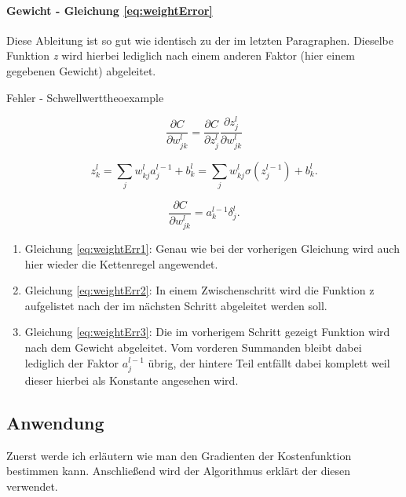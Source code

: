 \paragraph{Gewicht - Gleichung \ref{eq:weightError}}
Diese Ableitung ist so gut wie identisch zu der im letzten Paragraphen. Dieselbe Funktion \emph{z} wird hierbei lediglich nach einem anderen Faktor (hier einem gegebenen Gewicht) abgeleitet. 

\begin{myderivation}{Fehler - Schwellwert}{theoexample} 


\begin{equation} \label{eq:weightErr1}
\frac{\partial C}{\partial w^l_{jk}} = \frac{\partial C}{\partial z^l_j} \frac{\partial z^l_j}{\partial w^l_{jk}}
\end{equation}

\begin{equation} \label{eq:weightErr2}
z^{l}_k = \sum_j w^{l}_{kj} a^{l-1}_j +b^l_k = \sum_j w^l_{kj} \sigma(z^{l-1}_j) +b^l_k.
\end{equation}

\begin{equation} \label{eq:weightErr3}
\frac{\partial C}{\partial w^l_{jk}} = a^{l-1}_k \delta^l_j.
\end{equation}

\end{myderivation} 


\begin{enumerate}

\item Gleichung \ref{eq:weightErr1}: Genau wie bei der vorherigen Gleichung wird auch hier wieder die Kettenregel angewendet.  

\item Gleichung \ref{eq:weightErr2}: In einem Zwischenschritt wird die Funktion z aufgelistet nach der im nächsten Schritt abgeleitet werden soll. 

\item Gleichung \ref{eq:weightErr3}: Die im vorherigem Schritt gezeigt Funktion wird nach dem Gewicht abgeleitet. Vom vorderen Summanden bleibt dabei lediglich der Faktor $a^{l-1}_j$ übrig, der hintere Teil entfällt dabei komplett weil dieser hierbei als Konstante angesehen wird. 

\end{enumerate}




\subsection{Anwendung} 
Zuerst werde ich erläutern wie man den Gradienten der Kostenfunktion bestimmen kann. Anschließend wird der Algorithmus erklärt der diesen verwendet. 


